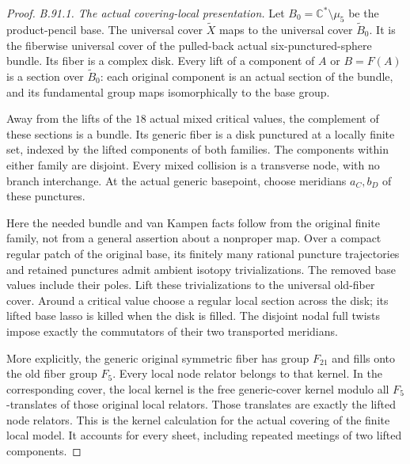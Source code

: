 \begin{proof}
\emph{B.91.1. The actual covering-local presentation.}
Let $B_0=\mathbb C^*\setminus\mu_5$ be the product-pencil base.
The universal cover $\widetilde X$ maps to the universal cover
$\widetilde B_0$. It is the fiberwise universal cover of the
pulled-back actual six-punctured-sphere bundle. Its fiber is a
complex disk. Every lift of a component of $A$ or $B=F(A)$ is a
section over $\widetilde B_0$: each original component is an actual
section of the bundle, and its fundamental group maps isomorphically
to the base group.

Away from the lifts of the $18$ actual mixed critical values, the
complement of these sections is a bundle. Its generic fiber is a
disk punctured at a locally finite set, indexed by the lifted
components of both families. The components within either family
are disjoint. Every mixed collision is a transverse node, with no
branch interchange. At the actual generic basepoint, choose meridians
$a_C,b_D$ of these punctures.

Here the needed bundle and van Kampen facts follow from the original
finite family, not from a general assertion about a nonproper map.
Over a compact regular patch of the original base, its finitely
many rational puncture trajectories and retained punctures admit
ambient isotopy trivializations. The removed base values include
their poles. Lift these trivializations to the universal old-fiber
cover. Around a critical value choose a regular local section across
the disk; its lifted base lasso is killed when the disk is filled.
The disjoint nodal full twists impose exactly the commutators of
their two transported meridians.

More explicitly, the generic original symmetric fiber has group
$F_{21}$ and fills onto the old fiber group $F_5$. Every local node
relator belongs to that kernel. In the corresponding cover, the
local kernel is the free generic-cover kernel modulo all
$F_5$-translates of those original local relators. Those translates
are exactly the lifted node relators. This is the kernel
calculation for the actual covering of the finite local model.
It accounts for every sheet, including repeated meetings of two
lifted components.


\end{proof}
